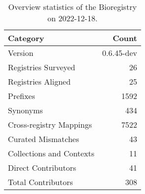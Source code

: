 \begin{table}
\centering
\caption{Overview statistics of the Bioregistry on 2022-12-18.}
\label{tab:bioregistry-summary}
\begin{tabular}{lr}
\toprule
                Category &      Count \\
\midrule
                 Version & 0.6.45-dev \\
     Registries Surveyed &         26 \\
      Registries Aligned &         25 \\
                Prefixes &       1592 \\
                Synonyms &        434 \\
 Cross-registry Mappings &       7522 \\
      Curated Mismatches &         43 \\
Collections and Contexts &         11 \\
     Direct Contributors &         41 \\
      Total Contributors &        308 \\
\bottomrule
\end{tabular}
\end{table}
